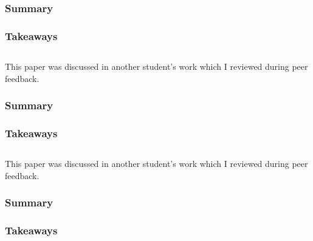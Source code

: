 \documentclass[
	letterpaper, %
]{jdf}
\begin{document}
\subsubsection{Summary}


\subsubsection{Takeaways}

\subsection{}
This paper was discussed in another student's work which I reviewed during peer feedback.

\subsubsection{Summary}


\subsubsection{Takeaways}

\subsection{}
This paper was discussed in another student's work which I reviewed during peer feedback.

\subsubsection{Summary}


\subsubsection{Takeaways}
\end{document}
